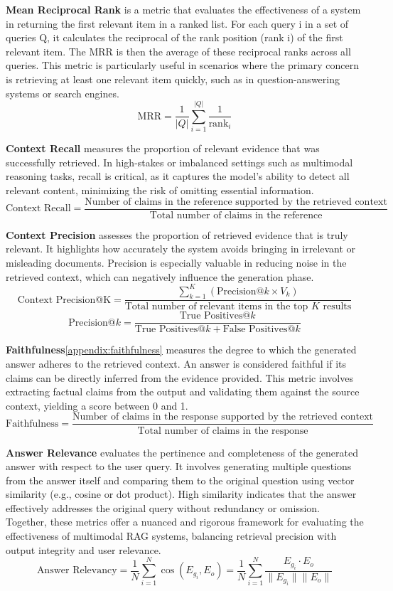 \documentclass[12pt,twoside]{report}
\begin{document}
\textbf{Mean Reciprocal Rank} is a metric that evaluates the effectiveness of a system in returning the first relevant item in a ranked list. For each query i in a set of queries 
Q, it calculates the reciprocal of the rank position (rank i) of the first relevant item. The MRR is then the average of these reciprocal ranks across all queries. This metric is particularly useful in scenarios where the primary concern is retrieving at least one relevant item quickly, such as in question-answering systems or search engines.
\[
\mathrm{MRR} = \frac{1}{|Q|} \sum_{i=1}^{|Q|} \frac{1}{\text{rank}_i}
\]

\textbf{Context Recall} measures the proportion of relevant evidence that was successfully retrieved. In high-stakes or imbalanced settings such as multimodal reasoning tasks, recall is critical, as it captures the model's ability to detect all relevant content, minimizing the risk of omitting essential information. \\
\[
\text{Context Recall} = \frac{\text{Number of claims in the reference supported by the retrieved context}}{\text{Total number of claims in the reference}}
\]

\textbf{Context Precision} assesses the proportion of retrieved evidence that is truly relevant. It highlights how accurately the system avoids bringing in irrelevant or misleading documents. Precision is especially valuable in reducing noise in the retrieved context, which can negatively influence the generation phase. \\
\[
\text{Context Precision@K} = \frac{\sum_{k=1}^{K} \left( \text{Precision@}k \times V_k \right)}{\text{Total number of relevant items in the top } K \text{ results}}
\]
\[
\text{Precision@}k = \frac{\text{True Positives@}k}{\text{True Positives@}k + \text{False Positives@}k}
\]

\textbf{Faithfulness}\ref{appendix:faithfulness} measures the degree to which the generated answer adheres to the retrieved context. An answer is considered faithful if its claims can be directly inferred from the evidence provided. This metric involves extracting factual claims from the output and validating them against the source context, yielding a score between 0 and 1. \\
\[
\text{Faithfulness} = \frac{\text{Number of claims in the response supported by the retrieved context}}{\text{Total number of claims in the response}}
\]


\textbf{Answer Relevance} evaluates the pertinence and completeness of the generated answer with respect to the user query. It involves generating multiple questions from the answer itself and comparing them to the original question using vector similarity (e.g., cosine or dot product). High similarity indicates that the answer effectively addresses the original query without redundancy or omission. \\
Together, these metrics offer a nuanced and rigorous framework for evaluating the effectiveness of multimodal RAG systems, balancing retrieval precision with output integrity and user relevance.
\[
\text{Answer Relevancy} = \frac{1}{N} \sum_{i=1}^{N} \cos(E_{g_i}, E_o) = \frac{1}{N} \sum_{i=1}^{N} \frac{E_{g_i} \cdot E_o}{\|E_{g_i}\| \|E_o\|}
\]
\end{document}
